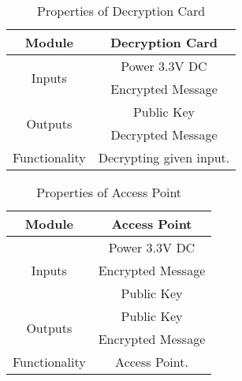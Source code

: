 \documentclass[12pt]{article}
\begin{document}
\begin{table}[h]

	\centering	
	\label{Properties of Decryption Card }
	\begin{tabular}{|c|c|}
	\hline
	Module & Decryption Card\\ \hline
		\multirow{2}{*}{Inputs} & Power 3.3V DC \\ \cline{2-2}
	& Encrypted Message \\ \hline
		\multirow{2}{*}{Outputs} & Public Key \\ \cline{2-2}
	& Decrypted Message \\ \hline
	Functionality & Decrypting given input.\\ \hline	
		
	\end{tabular}
	\caption{Properties of Decryption Card}

\end{table}
	\begin{table}[H]

		\centering		
		\label{Properties of Access Point }
		\begin{tabular}{|c|c|}
			\hline
			Module & Access Point \\ \hline
			\multirow{3}{*}{Inputs} & Power 3.3V DC \\
			
			\cline{2-2}
				& Encrypted Message \\
		
			\cline{2-2}
				& Public Key \\
			\cline{2-2} \hline
	
				\multirow{2}{*}{Outputs} 	& Public Key \\
			\cline{2-2}
			& Encrypted Message \\
			
			\cline{2-2} \hline
			
			Functionality & Access Point.\\ \hline	
	
		\end{tabular}
		\caption{Properties of Access Point}

	\end{table}
	
\end{document}
